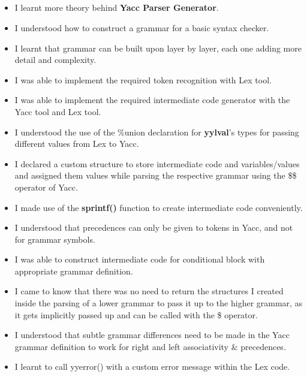 \documentclass[12pt, a4]{article}
\begin{document}
\subsection*{}
\begin{itemize}
\item I learnt more theory behind \textbf{Yacc Parser Generator}.
\item I understood how to construct a grammar for a basic syntax checker.
\item I learnt that grammar can be built upon layer by layer, each one adding more detail and complexity.
\item I was able to implement the required token recognition with Lex tool.
\item I was able to implement the required intermediate code generator with the Yacc tool and Lex tool.
\item I understood the use of the \%union declaration for \textbf{yylval}'s types for passing different values from Lex to Yacc.
\item I declared a custom structure to store intermediate code and variables/values and assigned them values while parsing the respective grammar using the \$\$ operator of Yacc.
\item I made use of the \textbf{sprintf()} function to create intermediate code conveniently.
\item I understood that precedences can only be given to tokens in Yacc, and not for grammar symbols.
\item I was able to construct intermediate code for conditional block with appropriate grammar definition.
\item I came to know that there was no need to return the structures I created inside the parsing of a lower grammar to pass it up to the higher grammar, as it gets implicitly passed up and can be called with the \$ operator.
\item I understood that subtle grammar differences need to be made in the Yacc grammar definition to work for right and left associativity \& precedences.
\item I learnt to call yyerror() with a custom error message within the Lex code.

\end{itemize}
\end{document}
